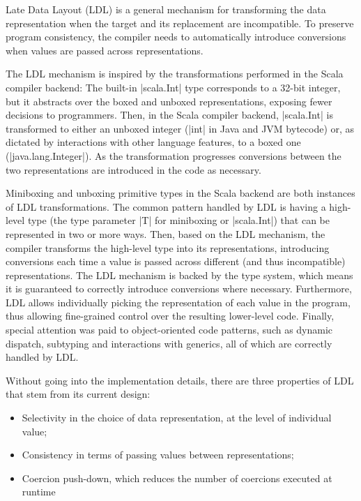 Late Data Layout (LDL) is a general mechanism for transforming the data representation when the target and its replacement are incompatible. To preserve program consistency, the compiler needs to automatically introduce conversions when values are passed across representations.

The LDL mechanism is inspired by the transformations performed in the Scala compiler backend: The built-in |scala.Int| type corresponds to a 32-bit integer, but it abstracts over the boxed and unboxed representations, exposing fewer decisions to programmers. Then, in the Scala compiler backend, |scala.Int| is transformed to either an unboxed integer (|int| in Java and JVM bytecode) or, as dictated by interactions with other language features, to a boxed one (|java.lang.Integer|). As the transformation progresses conversions between the two representations are introduced in the code as necessary.

Miniboxing and unboxing primitive types in the Scala backend are both instances of LDL transformations. The common pattern handled by LDL is having a high-level type (the type parameter |T| for miniboxing or |scala.Int|) that can be represented in two or more ways. Then, based on the LDL mechanism, the compiler transforms the high-level type into its representations, introducing conversions each time a value is passed across different (and thus incompatible) representations. The LDL mechanism is backed by the type system, which means it is guaranteed to correctly introduce conversions where necessary. Furthermore, LDL allows individually picking the representation of each value in the program, thus allowing fine-grained control over the resulting lower-level code. Finally, special attention was paid to object-oriented code patterns, such as dynamic dispatch, subtyping and interactions with generics, all of which are correctly handled by LDL.

Without going into the implementation details, there are three properties of LDL that stem from its current design:

\begin{itemize}
  \item Selectivity in the choice of data representation, at the level of individual value;
  \item Consistency in terms of passing values between representations; %
  \item Coercion push-down, which reduces the number of coercions executed at runtime
\end{itemize}


